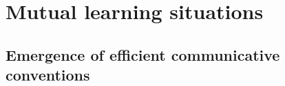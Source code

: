 \documentclass{article} %
\begin{document}




\section{Mutual learning situations}


\subsection{Emergence of efficient communicative conventions}
\label{sec:emergence}
\end{document}
